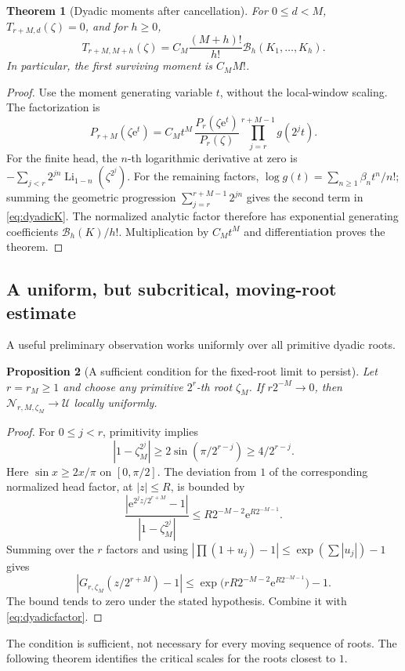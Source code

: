 \documentclass[11pt,letterpaper]{article}
\numberwithin{equation}{section}
\newtheorem{theorem}{Theorem}[section]
\newtheorem{proposition}[theorem]{Proposition}
\theoremstyle{definition}
\theoremstyle{remark}
\newcommand{\Li}{\operatorname{Li}}
\newcommand{\B}{\mathcal B}
\newcommand{\Up}{\mathcal U}
\newcommand{\Np}{\mathcal N}
\newcommand{\e}{\mathrm e}
\begin{document}
\begin{theorem}[Dyadic moments after cancellation]
For \(0\leq d<M\), \(T_{r+M,d}(\zeta)=0\), and for \(h\geq0\),
\begin{equation}
 T_{r+M,M+h}(\zeta)
 =C_M\frac{(M+h)!}{h!}\B_h(K_1,\ldots,K_h).
 \label{eq:dyadicmoments}
\end{equation}
In particular, the first surviving moment is \(C_MM!\).
\end{theorem}
\begin{proof}
Use the moment generating variable \(t\), without the local-window scaling. The factorization is
\[
 P_{r+M}(\zeta\e^t)
 =C_Mt^M\,
 \frac{P_r(\zeta\e^t)}{P_r(\zeta)}
 \prod_{j=r}^{r+M-1}g(2^jt).
\]
For the finite head, the \(n\)-th logarithmic derivative at zero is
\(-\sum_{j<r}2^{jn}\Li_{1-n}(\zeta^{2^j})\).
For the remaining factors, \(\log g(t)=\sum_{n\geq1}\beta_nt^n/n!\); summing the geometric progression \(\sum_{j=r}^{r+M-1}2^{jn}\) gives the second term in \eqref{eq:dyadicK}. The normalized analytic factor therefore has exponential generating coefficients \(\B_h(K)/h!\). Multiplication by \(C_Mt^M\) and differentiation proves the theorem.
\end{proof}

\subsection{A uniform, but subcritical, moving-root estimate}
A useful preliminary observation works uniformly over all primitive dyadic roots.

\begin{proposition}[A sufficient condition for the fixed-root limit to persist]
Let \(r=r_M\geq1\) and choose any primitive \(2^r\)-th root \(\zeta_M\). If \(r2^{-M}\to0\), then
\(\Np_{r,M,\zeta_M}\to\Up\) locally uniformly.
\end{proposition}
\begin{proof}
For \(0\leq j<r\), primitivity implies
\[
 |1-\zeta_M^{2^j}|\geq2\sin(\pi/2^{r-j})\geq 4/2^{r-j}.
\]
Here \(\sin x\geq2x/\pi\) on \([0,\pi/2]\). The deviation from \(1\) of the corresponding normalized head factor, at \(|z|\leq R\), is bounded by
\[
 \frac{|\e^{2^jz/2^{r+M}}-1|}{|1-\zeta_M^{2^j}|}
 \leq R2^{-M-2}\e^{R2^{-M-1}}.
\]
Summing over the \(r\) factors and using
\(|\prod(1+u_j)-1|\leq\exp(\sum|u_j|)-1\) gives
\begin{equation}
 \left|G_{r,\zeta_M}(z/2^{r+M})-1\right|
 \leq\exp\bigl(rR2^{-M-2}\e^{R2^{-M-1}}\bigr)-1.
 \label{eq:uniformhead}
\end{equation}
The bound tends to zero under the stated hypothesis. Combine it with \eqref{eq:dyadicfactor}.
\end{proof}
The condition is sufficient, not necessary for every moving sequence of roots. The following theorem identifies the critical scales for the roots closest to \(1\).
\end{document}
